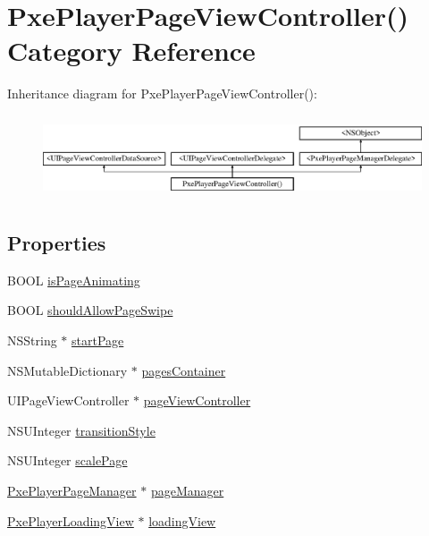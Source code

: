 \hypertarget{category_pxe_player_page_view_controller_07_08}{\section{Pxe\-Player\-Page\-View\-Controller() Category Reference}
\label{category_pxe_player_page_view_controller_07_08}
}
Inheritance diagram for Pxe\-Player\-Page\-View\-Controller()\-:\begin{figure}[H]
\begin{center}
\leavevmode
\includegraphics[height=2.488889cm]{category_pxe_player_page_view_controller_07_08}
\end{center}
\end{figure}
\subsection*{Properties}
\begin{DoxyCompactItemize}
\item 
B\-O\-O\-L \hyperlink{category_pxe_player_page_view_controller_07_08_af365be45f0c1dee605f424d149e23bbe}{is\-Page\-Animating}
\item 
B\-O\-O\-L \hyperlink{category_pxe_player_page_view_controller_07_08_aee05105a7a1e6407c1e86b6ed04ae2a9}{should\-Allow\-Page\-Swipe}
\item 
N\-S\-String $\ast$ \hyperlink{category_pxe_player_page_view_controller_07_08_ae3b736e136429f4b8cc93b93fa680703}{start\-Page}
\item 
N\-S\-Mutable\-Dictionary $\ast$ \hyperlink{category_pxe_player_page_view_controller_07_08_afb00dbfd0c479fe097a1fd1357826fd8}{pages\-Container}
\item 
U\-I\-Page\-View\-Controller $\ast$ \hyperlink{category_pxe_player_page_view_controller_07_08_a7a2a974b2f99a60d2557c304281e6226}{page\-View\-Controller}
\item 
N\-S\-U\-Integer \hyperlink{category_pxe_player_page_view_controller_07_08_a5d1f551e72ef07acb9057d1c68d4e4a3}{transition\-Style}
\item 
N\-S\-U\-Integer \hyperlink{category_pxe_player_page_view_controller_07_08_a2d0cd55db172a5b8d943ab0ad47d555d}{scale\-Page}
\item 
\hyperlink{interface_pxe_player_page_manager}{Pxe\-Player\-Page\-Manager} $\ast$ \hyperlink{category_pxe_player_page_view_controller_07_08_aff618947eec45f461b189b6971198a5d}{page\-Manager}
\item 
\hyperlink{interface_pxe_player_loading_view}{Pxe\-Player\-Loading\-View} $\ast$ \hyperlink{category_pxe_player_page_view_controller_07_08_a52b8cccbb0b8acb9ae499f77281c65fd}{loading\-View}
\end{DoxyCompactItemize}
